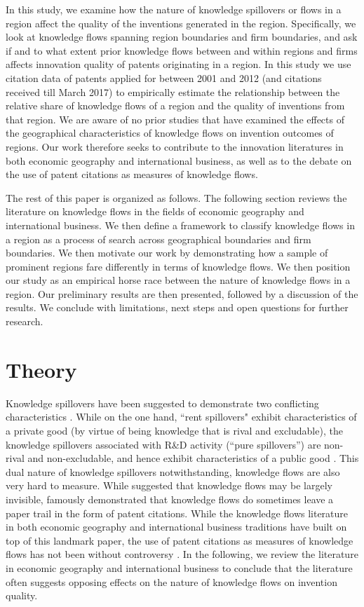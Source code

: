 \documentclass[12pt,letterpaper]{article}
\begin{document}
In this study, we examine how the nature of knowledge spillovers or flows in a region affect the quality of the inventions generated in the region. Specifically, we look at knowledge flows spanning region boundaries and firm boundaries, and ask if and to what extent prior knowledge flows between and within regions and firms affects innovation quality of patents originating in a region. In this study we use citation data of patents applied for between 2001 and 2012 (and citations received till March 2017) to empirically estimate the relationship between the relative share of knowledge flows of a region and the quality of inventions from that region. We are aware of no prior studies that have examined the effects of the geographical characteristics of knowledge flows on invention outcomes of regions. Our work therefore seeks to contribute to the innovation literatures in both economic geography and international business, as well as to the debate on the use of patent citations as measures of knowledge flows. \par 

The rest of this paper is organized as follows. The following section reviews the literature on knowledge flows in the fields of economic geography and international business. We then define a framework to classify knowledge flows in a region as a process of search across geographical boundaries and firm boundaries. We then motivate our work by demonstrating how a sample of prominent regions fare differently in terms of knowledge flows. We then position our study as an empirical horse race between the nature of knowledge flows in a region. Our preliminary results are then presented, followed by a discussion of the results. We conclude with limitations, next steps and open questions for further research.



\section*{Theory}
Knowledge spillovers have been suggested to demonstrate two conflicting characteristics \citep{Griliches1979}. While on the one hand, ``rent spillovers" exhibit characteristics of a private good (by virtue of being knowledge that is rival and excludable), the knowledge spillovers associated with R\&D activity (``pure spillovers'') are non-rival and non-excludable, and hence exhibit characteristics of a public good \citep{Arrow1962}.  This dual nature of knowledge spillovers notwithstanding, knowledge flows are also very hard to measure.  While \cite{Krugman1991a} suggested that knowledge flows may be largely invisible, \cite*{Jaffe1993} famously demonstrated that  knowledge flows do sometimes leave a paper trail in the form of patent citations. While the knowledge flows literature in both economic geography and international business traditions have built on top of this landmark paper, the use of patent citations as measures of knowledge flows has not been without controversy \citep*{Arora2017a, Alcacer2006a}.  In the following, we review the literature in economic geography and international business to conclude that the literature often suggests opposing effects on the nature of knowledge flows on invention quality. 
\end{document}
